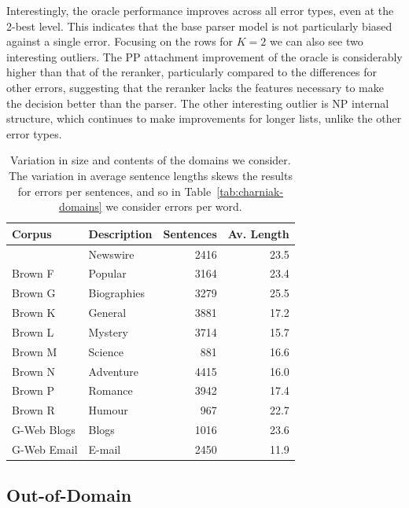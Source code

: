 Interestingly, the oracle performance improves across all error types, even at
the 2-best level.  This indicates that the base parser model is not
particularly biased against a single error.  Focusing on the rows for $K=2$ we
can also see two interesting outliers.  The PP attachment improvement of the
oracle is considerably higher than that of the reranker, particularly compared
to the differences for other errors, suggesting that the reranker lacks the
features necessary to make the decision better than the parser.  The other
interesting outlier is NP internal structure, which continues to make
improvements for longer lists, unlike the other error types.

\begin{table}
\begin{center}
\begin{tabular}{|llrr|}
	\hline
		Corpus & Description & Sentences & Av. Length \\
	\hline
	\hline
		\wsj 23 & Newswire & 2416 & 23.5 \\
		Brown F & Popular & 3164 & 23.4 \\
		Brown G & Biographies & 3279 & 25.5 \\
		Brown K & General & 3881 & 17.2 \\
		Brown L & Mystery & 3714 & 15.7 \\
		Brown M & Science & 881 & 16.6 \\
		Brown N & Adventure & 4415 & 16.0 \\
		Brown P & Romance & 3942 & 17.4 \\
		Brown R & Humour & 967 & 22.7 \\
		G-Web Blogs & Blogs & 1016 & 23.6 \\
		G-Web Email & E-mail & 2450 & 11.9 \\
	\hline
\end{tabular}
\caption[Variation in size and contents of the domains we consider.]{ \label{tab:domain-info}
	Variation in size and contents of the domains we consider.	The variation in
	average sentence lengths skews the results for errors per sentences, and so
	in Table~\ref{tab:charniak-domains} we consider errors per word.
}
\end{center}
\end{table}

\subsection{Out-of-Domain}

